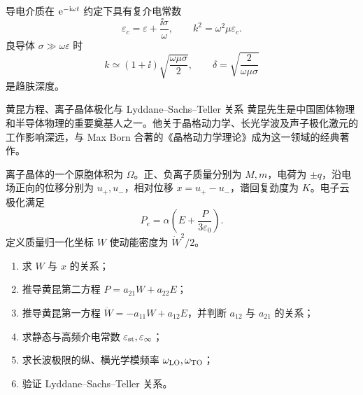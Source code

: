 导电介质在 $\mathrm e^{-\mathrm i\omega t}$ 约定下具有复介电常数
\[
 \varepsilon_c=\varepsilon+\frac{\ii\sigma}{\omega},
 \qquad k^2=\omega^2\mu\varepsilon_c.
\]
良导体 $\sigma\gg\omega\varepsilon$ 时
\[
 k\simeq(1+\ii)\sqrt{\frac{\omega\mu\sigma}{2}},
 \qquad
 \boxed{\delta=\sqrt{\frac2{\omega\mu\sigma}}}
\]
是趋肤深度。

\begin{advexamplebox}{黄昆方程、离子晶体极化与 Lyddane--Sachs--Teller 关系}\label{advA4:ex:huang-kun}
黄昆先生是中国固体物理和半导体物理的重要奠基人之一。他关于晶格动力学、长光学波及声子极化激元的工作影响深远，与 Max Born 合著的《晶格动力学理论》成为这一领域的经典著作。

离子晶体的一个原胞体积为 $\Omega$。正、负离子质量分别为 $M,m$，电荷为 $\pm q$，沿电场正向的位移分别为 $u_+,u_-$，相对位移 $x=u_+-u_-$，谐回复劲度为 $K$。电子云极化满足
\[
 P_e=\alpha\left(E+\frac{P}{3\varepsilon_0}\right).
\]
定义质量归一化坐标 $W$ 使动能密度为 $\dot W^2/2$。
\begin{enumerate}
 \item 求 $W$ 与 $x$ 的关系；
 \item 推导黄昆第二方程 $P=a_{21}W+a_{22}E$；
 \item 推导黄昆第一方程 $\ddot W=-a_{11}W+a_{12}E$，并判断 $a_{12}$ 与 $a_{21}$ 的关系；
 \item 求静态与高频介电常数 $\varepsilon_{\rm st},\varepsilon_\infty$；
 \item 求长波极限的纵、横光学模频率 $\omega_{\rm LO},\omega_{\rm TO}$；
 \item 验证 Lyddane--Sachs--Teller 关系。
\end{enumerate}

\begin{center}\begin{minipage}{.96\linewidth}\centering
{}
\label{advA4:quality:A4-waves:q1}
\end{minipage}\end{center}
\end{advexamplebox}
